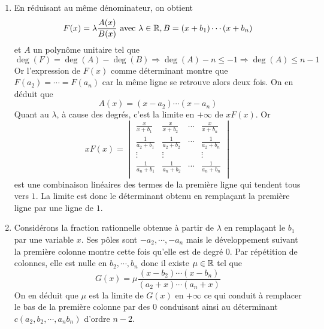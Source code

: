 \begin{enumerate}
\begin{enumerate}
  \item En réduisant au même dénominateur, on obtient
\begin{displaymath}
  F(x) = \lambda \frac{A(x)}{B(x)}\text{ avec } \lambda \in \mathbb{R}, B=(x+b_1)\cdots(x+b_n)
\end{displaymath}
et $A$ un polynôme unitaire tel que 
\begin{displaymath}
  \deg(F)= \deg(A) - \deg(B)\Rightarrow \deg(A)- n \leq -1 \Rightarrow \deg(A)\leq n-1
\end{displaymath}
Or l'expression de $F(x)$ comme déterminant montre que $F(a_2)=\cdots=F(a_n)$ car la même ligne se retrouve alors deux fois. On en déduit que 
\begin{displaymath}
  A(x) = (x-a_2)\cdots(x-a_n)
\end{displaymath}
Quant au $\lambda$, à cause des degrés, c'est la limite en $+\infty$ de $xF(x)$. Or
\begin{displaymath}
xF(x)=
\begin{vmatrix}
  \frac{x}{x+b_1} & \frac{x}{x+b_2} & \cdots & \frac{x}{x+b_n} \\ 
  \frac{1}{a_2+b_1} & \frac{1}{a_2+b_2} & \cdots & \frac{1}{a_2+b_n} \\
  \vdots            & \vdots            &        & \vdots \\
  \frac{1}{a_n+b_1} & \frac{1}{a_n+b_2} & \cdots & \frac{1}{a_n+b_n} \\
\end{vmatrix}
\end{displaymath}
est une combinaison linéaires des termes de la première ligne qui tendent tous vers $1$. La limite est donc le déterminant obtenu en remplaçant la première ligne par une ligne de $1$.

  \item Considérons la fraction rationnelle obtenue à partir de $\lambda$ en remplaçant le $b_1$ par une variable $x$. Ses pôles sont $-a_2, \cdots, -a_n$ mais le développement suivant la première colonne montre cette fois qu'elle est de degré $0$. Par répétition de colonnes, elle est nulle en $b_2,\cdots, b_n$ donc il existe $\mu\in \mathbb{R}$ tel que 
\begin{displaymath}
  G(x) = \mu \frac{(x-b_2)\cdots(x-b_n)}{(a_2+x)\cdots(a_n+x)}
\end{displaymath}
On en déduit que $\mu$ est la limite de $G(x)$ en $+\infty$ ce qui conduit à remplacer le bas de la première colonne par des $0$ conduisant ainsi au déterminant $c(a_2,b_2,\cdots,a_nb_n)$ d'ordre $n-2$.
\end{enumerate}

\end{enumerate}
